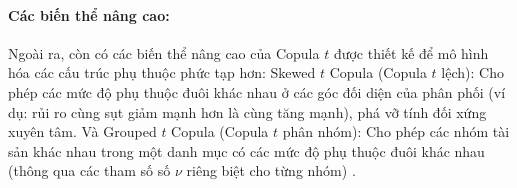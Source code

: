 \paragraph{Các biến thể nâng cao:}
Ngoài ra, còn có các biến thể nâng cao của Copula $t$ được thiết kế để mô hình hóa các cấu trúc phụ thuộc phức tạp hơn: Skewed $t$ Copula (Copula $t$ lệch): Cho phép các mức độ phụ thuộc đuôi khác nhau ở các góc đối diện của phân phối (ví dụ: rủi ro cùng sụt giảm mạnh hơn là cùng tăng mạnh), phá vỡ tính đối xứng xuyên tâm. Và Grouped $t$ Copula (Copula $t$ phân nhóm): Cho phép các nhóm tài sản khác nhau trong một danh mục có các mức độ phụ thuộc đuôi khác nhau (thông qua các tham số số $\nu$ riêng biệt cho từng nhóm) \cite{vrins2009doublet}.

